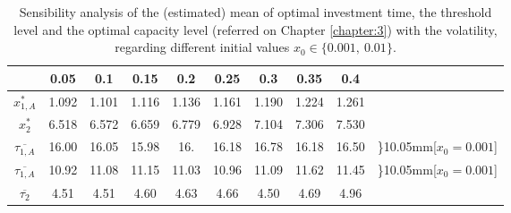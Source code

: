 \begin{table}[!ht]
	\centering
	\caption{Sensibility analysis of the (estimated) mean of optimal investment time, the threshold level and the optimal capacity level (referred on Chapter \ref{chapter:3}) with the volatility, regarding different initial values $x_0 \in \{0.001, \ 0.01\}$.}
	\begin{tabular}{c|ccccccccc}
		\hline
		\text{ $\sigma $ } & 0.05 & 0.1 & 0.15 & 0.2 & 0.25 & 0.3 & 0.35 & 0.4 \\ \hline
		$x_{1,A}^*$ & 1.092 & 1.101 & 1.116 & 1.136 & 1.161 & 1.190 & 1.224 & 1.261   \\
		$x_2^*$ & 6.518 & 6.572 & 6.659 & 6.779 & 6.928 & 7.104 & 7.306 & 7.530  \\ \hline
		$\overline{\tau _{1,A}}$ & 16.00 & 16.05 & 15.98 & 16. & 16.18 & 16.78 & 16.18 & 16.50  & \rdelim\}{1}{0.05mm}[$x_0=0.001$] \\
		$\overline{\tau _{1,A}}$ & 10.92 & 11.08 & 11.15 & 11.03 & 10.96 & 11.09 & 11.62 & 11.45 & \rdelim\}{1}{0.05mm}[$x_0=0.001$]  \\ \hline
		$\overline{\tau _2}$ & 4.51 & 4.51 & 4.60 & 4.63 & 4.66 & 4.50 & 4.69 & 4.96   \\ \hline
	\end{tabular}
\label{tab:vol_3}
\end{table}


